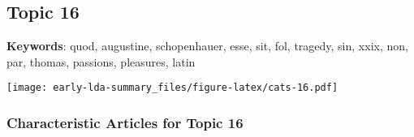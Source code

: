 \documentclass[
]{article}
\begin{document}
\newpage

\hypertarget{topic-16}{%
\subsection{Topic 16}\label{topic-16}}

\textbf{Keywords}: quod, augustine, schopenhauer, esse, sit, fol,
tragedy, sin, xxix, non, par, thomas, passions, pleasures, latin

\texttt{[image: early-lda-summary\_files/figure-latex/cats-16.pdf]}
\newpage 

\hypertarget{characteristic-articles-for-topic-16}{%
\subsubsection{Characteristic Articles for Topic
16}\label{characteristic-articles-for-topic-16}}
\end{document}
